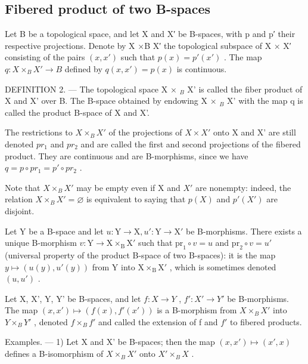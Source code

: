 \subsection{Fibered product of two B-spaces}

Let B be a topological space, and let X and X′ be B-spaces, with p and p′ their respective projections. Denote by X ×B X′ the topological subspace of X × X′ consisting of the pairs \((x, x')\) such that \(p(x) = p'(x')\) . The map \(q: X \times_{B} X' \to B\) defined by \(q(x, x') = p(x)\) is continuous.

DEFINITION 2. --- The topological space X × \(_{B}\) X' is called the fiber product of X and X' over B. The B-space obtained by endowing X × \(_{B}\) X' with the map q is called the product B-space of X and X'.

The restrictions to \(X \times_{B} X'\) of the projections of \(X \times X'\) onto X and X' are still denoted \(pr_{1}\) and \(pr_{2}\) and are called the first and second projections of the fibered product. They are continuous and are B-morphisms, since we have \(q = p \circ pr_{1} = p' \circ pr_{2}\) .

Note that \(X \times_{B} X'\) may be empty even if X and \(X'\) are nonempty: indeed, the relation \(X \times_{B} X' = \varnothing\) is equivalent to saying that \(p(X)\) and \(p'(X')\) are disjoint.

Let Y be a B-space and let \(u\colon\mathrm{Y}\to\mathrm{X}, u'\colon\mathrm{Y}\to\mathrm{X}'\) be B-morphisms. There exists a unique B-morphism \(v\colon\mathrm{Y}\to\mathrm{X}\times_{\mathrm{B}}\mathrm{X}'\) such that \(\mathrm{pr}_{1}\circ v=u\) and \(\mathrm{pr}_{2}\circ v=u'\) (universal property of the product B-space of two B-spaces): it is the map \(y\mapsto(u(y),u'(y))\) from Y into \(\mathrm{X}\times_{\mathrm{B}}\mathrm{X}'\) , which is sometimes denoted \((u,u')\) .

Let X, X', Y, Y' be B-spaces, and let \(f: X \to Y\) , \(f': X' \to Y'\) be B-morphisms. The map \((x, x') \mapsto (f(x), f'(x'))\) is a B-morphism from \(X \times_{B} X'\) into \(Y \times_{B} Y'\) , denoted \(f \times_{B} f'\) and called the extension of f and \(f'\) to fibered products.

Examples. --- 1) Let X and X' be B-spaces; then the map \((x, x') \mapsto (x', x)\) defines a B-isomorphism of \(X \times_{B} X'\) onto \(X' \times_{B} X\) .

